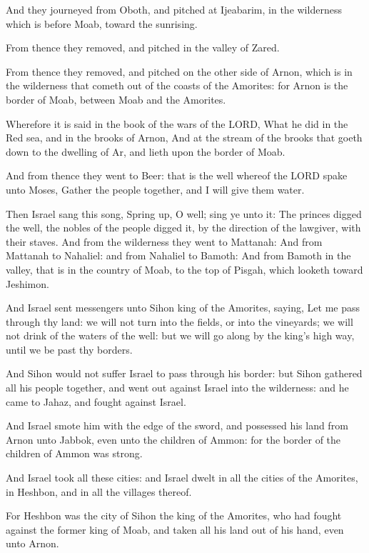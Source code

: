 \Verse And they journeyed from Oboth, and pitched at Ijeabarim, in the
wilderness which is before Moab, toward the sunrising.

\Verse From thence they removed, and pitched in the valley of Zared.

\Verse From thence they removed, and pitched on the other side of
Arnon, which is in the wilderness that cometh out of the coasts of the
Amorites: for Arnon is the border of Moab, between Moab and the
Amorites.

\Verse Wherefore it is said in the book of the wars of the LORD, What
he did in the Red sea, and in the brooks of Arnon, \Verse And at the
stream of the brooks that goeth down to the dwelling of Ar, and lieth
upon the border of Moab.

\Verse And from thence they went to Beer: that is the well whereof the
LORD spake unto Moses, Gather the people together, and I will give
them water.

\Verse Then Israel sang this song, Spring up, O well; sing ye unto it:
\Verse The princes digged the well, the nobles of the people digged it,
by the direction of the lawgiver, with their staves. And from the
wilderness they went to Mattanah: \Verse And from Mattanah to Nahaliel:
and from Nahaliel to Bamoth: \Verse And from Bamoth in the valley, that
is in the country of Moab, to the top of Pisgah, which looketh toward
Jeshimon.

\Verse And Israel sent messengers unto Sihon king of the Amorites,
saying, \Verse Let me pass through thy land: we will not turn into the
fields, or into the vineyards; we will not drink of the waters of the
well: but we will go along by the king's high way, until we be past
thy borders.

\Verse And Sihon would not suffer Israel to pass through his border:
but Sihon gathered all his people together, and went out against
Israel into the wilderness: and he came to Jahaz, and fought against
Israel.

\Verse And Israel smote him with the edge of the sword, and possessed
his land from Arnon unto Jabbok, even unto the children of Ammon: for
the border of the children of Ammon was strong.

\Verse And Israel took all these cities: and Israel dwelt in all the
cities of the Amorites, in Heshbon, and in all the villages thereof.

\Verse For Heshbon was the city of Sihon the king of the Amorites, who
had fought against the former king of Moab, and taken all his land out
of his hand, even unto Arnon.

